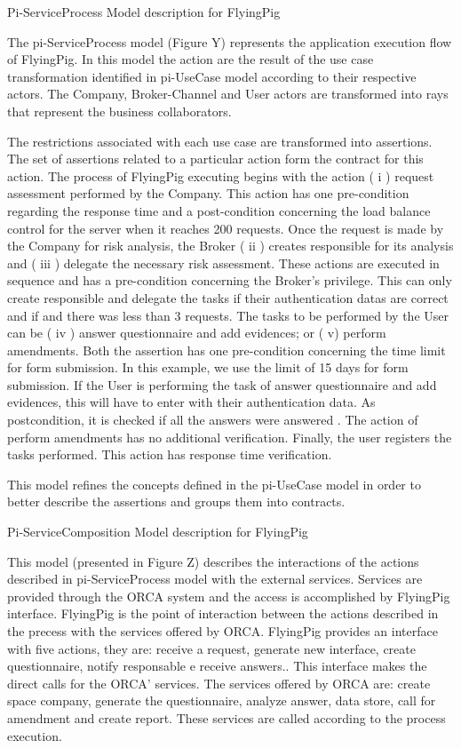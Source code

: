 Pi-ServiceProcess Model description for FlyingPig 

The pi-ServiceProcess model (Figure Y) represents the application execution flow of FlyingPig. In this model the action are the result of the use case transformation identified in pi-UseCase model according to their respective actors. The Company, Broker-Channel and User actors are transformed into rays that represent the business collaborators.

The restrictions associated with each use case are transformed into assertions. The set of assertions related to a particular action form the contract for this action. The process of FlyingPig executing begins with the action ( i ) request assessment performed by the Company. This action has one pre-condition regarding the response time and a post-condition concerning the load balance control for the server when it reaches 200 requests. Once the request is made by the Company for risk analysis, the Broker ( ii ) creates responsible for its analysis and ( iii ) delegate the necessary risk assessment. These actions are executed in sequence and has a pre-condition concerning the Broker's privilege. This can only create responsible and delegate the tasks if their authentication datas are correct and if and there was less than 3 requests. The tasks to be performed by the User can be ( iv ) answer questionnaire and add evidences; or ( v) perform amendments. Both the assertion has one pre-condition concerning the time limit for form submission. In this example, we use the limit of 15 days for form submission. If the User is performing the task of answer questionnaire and add evidences, this will have to enter with their authentication data. As postcondition, it is checked if all the answers were answered . The action of perform amendments has no additional verification. Finally, the user registers the tasks performed. This action has response time verification.

This model refines the concepts defined in the pi-UseCase model in order to better describe the assertions and groups them into contracts.


Pi-ServiceComposition Model description for FlyingPig 

This model (presented in Figure Z) describes the interactions of the actions described in pi-ServiceProcess model with the external services. Services are provided through the ORCA system and the access is accomplished by FlyingPig interface. FlyingPig is the point of interaction between the actions described in the precess with the services offered by ORCA. FlyingPig provides an interface with five actions, they are: receive a request, generate new interface, create questionnaire, notify responsable e receive answers.. This interface makes the direct calls for the ORCA' services. The services offered by ORCA are: create space company, generate the questionnaire, analyze answer, data store, call for amendment and create report. These services are called according to the process execution.

